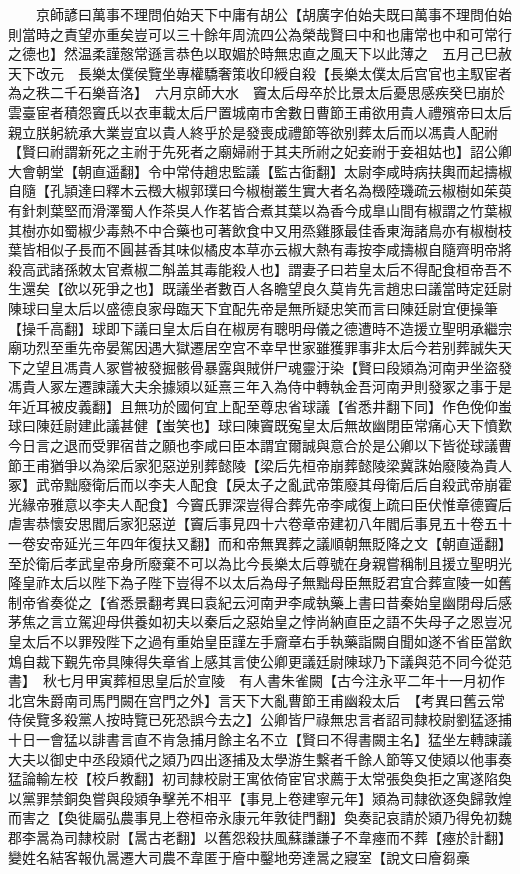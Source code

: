 　　京師諺曰萬事不理問伯始天下中庸有胡公【胡廣字伯始夫既曰萬事不理問伯始則當時之責望亦重矣豈可以三十餘年周流四公為榮哉賢曰中和也庸常也中和可常行之德也】然温柔謹慤常遜言恭色以取媚於時無忠直之風天下以此薄之　五月己巳赦天下改元　長樂太僕侯覽坐專權驕奢策收印綬自殺【長樂太僕太后宫官也主馭宦者為之秩二千石樂音洛】　六月京師大水　竇太后母卒於比景太后憂思感疾癸巳崩於雲臺宦者積怨竇氏以衣車載太后尸置城南市舍數日曹節王甫欲用貴人禮殯帝曰太后親立朕躬統承大業豈宜以貴人終乎於是發喪成禮節等欲别葬太后而以馮貴人配祔【賢曰祔謂新死之主祔于先死者之廟婦祔于其夫所祔之妃妾祔于妾祖姑也】詔公卿大會朝堂【朝直遥翻】令中常侍趙忠監議【監古衘翻】太尉李咸時病扶輿而起擣椒自隨【孔頴達曰釋木云檓大椒郭璞曰今椒樹叢生實大者名為檓陸璣疏云椒樹如茱萸有針刺葉堅而滑澤蜀人作茶吳人作茗皆合煮其葉以為香今成臯山間有椒謂之竹葉椒其樹亦如蜀椒少毒熱不中合藥也可著飲食中又用烝雞豚最佳香東海諸鳥亦有椒樹枝葉皆相似子長而不圓甚香其味似橘皮本草亦云椒大熱有毒按李咸擣椒自隨齊明帝將殺高武諸孫敇太官煮椒二斛盖其毒能殺人也】謂妻子曰若皇太后不得配食桓帝吾不生還矣【欲以死爭之也】既議坐者數百人各瞻望良久莫肯先言趙忠曰議當時定廷尉陳球曰皇太后以盛德良家母臨天下宜配先帝是無所疑忠笑而言曰陳廷尉宜便操筆【操千高翻】球即下議曰皇太后自在椒房有聰明母儀之德遭時不造援立聖明承繼宗廟功烈至重先帝晏駕因遇大獄遷居空宫不幸早世家雖獲罪事非太后今若别葬誠失天下之望且馮貴人冢嘗被發掘骸骨暴露與賊併尸魂靈汙染【賢曰段熲為河南尹坐盜發馮貴人冢左遷諫議大夫余據熲以延熹三年入為侍中轉執金吾河南尹則發冢之事于是年近耳被皮義翻】且無功於國何宜上配至尊忠省球議【省悉井翻下同】作色俛仰蚩球曰陳廷尉建此議甚健【蚩笑也】球曰陳竇既寃皇太后無故幽閉臣常痛心天下憤歎今日言之退而受罪宿昔之願也李咸曰臣本謂宜爾誠與意合於是公卿以下皆從球議曹節王甫猶爭以為梁后家犯惡逆别葬懿陵【梁后先桓帝崩葬懿陵梁冀誅始廢陵為貴人冢】武帝黜廢衛后而以李夫人配食【戾太子之亂武帝策廢其母衛后后自殺武帝崩霍光緣帝雅意以李夫人配食】今竇氏罪深豈得合葬先帝李咸復上疏曰臣伏惟章德竇后虐害恭懷安思閻后家犯惡逆【竇后事見四十六卷章帝建初八年閻后事見五十卷五十一卷安帝延光三年四年復扶又翻】而和帝無異葬之議順朝無貶降之文【朝直遥翻】至於衛后孝武皇帝身所廢棄不可以為比今長樂太后尊號在身親嘗稱制且援立聖明光隆皇祚太后以陛下為子陛下豈得不以太后為母子無黜母臣無貶君宜合葬宣陵一如舊制帝省奏從之【省悉景翻考異曰袁紀云河南尹李咸執藥上書曰昔秦始皇幽閉母后感茅焦之言立駕迎母供養如初夫以秦后之惡始皇之悖尚納直臣之語不失母子之恩豈况皇太后不以罪殁陛下之過有重始皇臣謹左手齎章右手執藥詣闕自聞如遂不省臣當飲鴆自裁下覲先帝具陳得失章省上感其言使公卿更議廷尉陳球乃下議與范不同今從范書】　秋七月甲寅葬桓思皇后於宣陵　有人書朱雀闕【古今注永平二年十一月初作北宫朱爵南司馬門闕在宫門之外】言天下大亂曹節王甫幽殺太后　【考異曰舊云常侍侯覽多殺黨人按時覽已死恐誤今去之】公卿皆尸祿無忠言者詔司隸校尉劉猛逐捕十日一會猛以誹書言直不肯急捕月餘主名不立【賢曰不得書闕主名】猛坐左轉諫議大夫以御史中丞段熲代之熲乃四出逐捕及太學游生繫者千餘人節等又使熲以他事奏猛論輸左校【校戶教翻】初司隸校尉王寓依倚宦官求薦于太常張奐奐拒之寓遂陷奐以黨罪禁銅奐嘗與段熲争擊羌不相平【事見上卷建寧元年】熲為司隸欲逐奐歸敦煌而害之【奐徙屬弘農事見上卷桓帝永康元年敦徒門翻】奐奏記哀請於熲乃得免初魏郡李暠為司隸校尉【暠古老翻】以舊怨殺扶風蘇謙謙子不韋瘞而不葬【瘞於計翻】變姓名結客報仇暠遷大司農不韋匿于廥中鑿地旁達暠之寢室【說文曰廥芻槀